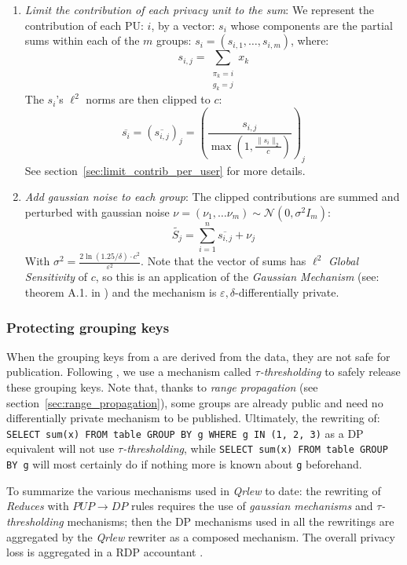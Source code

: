 \documentclass[letterpaper]{article} %
\newcommand{\qrlew}{\emph{Qrlew}}
\begin{document}
\begin{enumerate}
	\item \emph{Limit the contribution of each \emph{privacy unit} to the sum}:
	We represent the contribution of each PU: $i$, by a vector: $s_i$ whose components are the partial sums within each of the $m$ groups: $s_i = \left(s_{i,1},\ldots, s_{i,m}\right)$, where:
    $$s_{i,j} = \sum_{\substack{\pi_k = i\\g_k = j}}x_k$$
    The $s_i$'s $\ell^2$ norms are then clipped to $c$:
    $$\overline{s_i} = \left(\overline{s_{i,j}}\right)_j = \left(\frac{s_{i,j}}{\max\left(1, \frac{\|s_i\|_2}{c}\right)}\right)_j$$
    See section~\ref{sec:limit_contrib_per_user} for more details.

	\item \emph{Add gaussian noise to each group}:
	The clipped contributions are summed and perturbed with gaussian noise $\nu = \left(\nu_1,\ldots \nu_m\right) \sim \mathcal{N}\left(0, \sigma^2I_m\right)$:
    $$\widetilde{S_j} = \sum_{i=1}^n \overline{s_{i,j}} + \nu_j$$
    With $\sigma^2={\frac {2\ln(1.25/\delta )\cdot c^{2}}{\varepsilon ^{2}}}$.
    Note that the vector of sums has $\ell^2$ \emph{Global Sensitivity} of $c$, so this is an application of the \emph{Gaussian Mechanism} (see: theorem A.1. in \cite{dwork2014algorithmic}) and the mechanism is $\varepsilon, \delta$-differentially private.
\end{enumerate}

\subsubsection{Protecting grouping keys}

When the grouping keys from a are derived from the data, they are not safe for publication.
Following \cite{korolova2009releasing, wilson2019differentially}, we use a mechanism called \emph{$\tau$-thresholding} to safely release these grouping keys.
Note that, thanks to \emph{range propagation} (see section~\ref{sec:range_propagation}), some groups are already public and need no differentially private mechanism to be published.
Ultimately, the rewriting of: \texttt{SELECT sum(x) FROM table GROUP BY g WHERE g IN (1, 2, 3)} as a DP equivalent will not use \emph{$\tau$-thresholding}, while \texttt{SELECT sum(x) FROM table GROUP BY g} will most certainly do if nothing more is known about \texttt{g} beforehand.

To summarize the various mechanisms used in \qrlew{} to date:
the rewriting of \emph{Reduces} with $PUP \rightarrow DP$ rules requires the use of \emph{gaussian mechanisms} and \emph{$\tau$-thresholding} mechanisms;
then the DP mechanisms used in all the rewritings are aggregated by the \qrlew{} rewriter as a composed mechanism.
The overall privacy loss is aggregated in a RDP accountant \cite{mironov2017renyi}.
\end{document}

